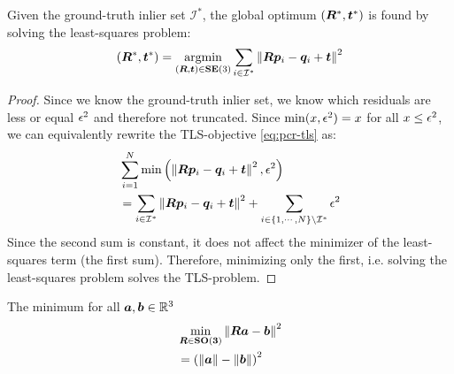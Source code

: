 \clearpage
\setcounter{page}{1}
\maketitlesupplementary

\begin{theorem}
	Given the ground-truth inlier set $\mathcal{I}^*$, the global optimum $({\bm R}^*, \boldsymbol{t}^*)$ is found by solving the least-squares problem:
	\begin{equation}
		\begin{aligned}
			({\bm R}^*, \boldsymbol{t}^*) = \operatorname*{argmin}_{({\bm R}, \boldsymbol{t}) \in \mathbf{SE(\textrm{3})}} \sum_{i \in \mathcal{I}^*} \left\|{\bm R} \boldsymbol{p}_i - \boldsymbol{q}_i + \boldsymbol{t}\right\|^2
		\end{aligned}
	\end{equation}
\end{theorem}

\begin{proof}
    \label{proof:gt-corrs-solves-tls}
	Since we know the ground-truth inlier set, we know which residuals are less or equal $\epsilon^2$ and therefore not truncated. Since $\min(x, \epsilon^2) = x$ for all $x \leq \epsilon^2$, we can equivalently rewrite the TLS-objective \ref{eq:pcr-tls} as:
    \begin{equation}
	\begin{aligned}
		&\sum_{i=1}^{N} \min \left(\left\|{\bm R} \boldsymbol{p}_i - \boldsymbol{q}_i + \boldsymbol{t}\right\|^2, \epsilon^2 \right)\\
        &= \sum_{i \in \mathcal{I}^*} \left\|{\bm R} \boldsymbol{p}_i - \boldsymbol{q}_i  + \boldsymbol{t}\right\|^2  + \sum_{i \in \{1, \cdots, N\}  \setminus \mathcal{I}^*} \epsilon^2
	\end{aligned}
    \end{equation}
    Since the second sum is constant, it does not affect the minimizer of the least-squares term (the first sum). Therefore, minimizing only  the first, i.e. solving the least-squares problem solves the TLS-problem.
\end{proof}


\begin{lemma}\label{lemma:ls-rot}
	The minimum for all $\boldsymbol{a}, \boldsymbol{b} \in \mathbb{R}^3$
	\begin{equation}
		\begin{aligned}
			&\min_{{\bm R} \in \mathbf{SO(3)}} \left\|{\bm R} \boldsymbol{a} - \boldsymbol{b}\right\|^2\\
			&= \left( \left\| \boldsymbol{a} \right\| - \left\| \boldsymbol{b} \right\| \right)^2
		\end{aligned}
	\end{equation}
\end{lemma}


